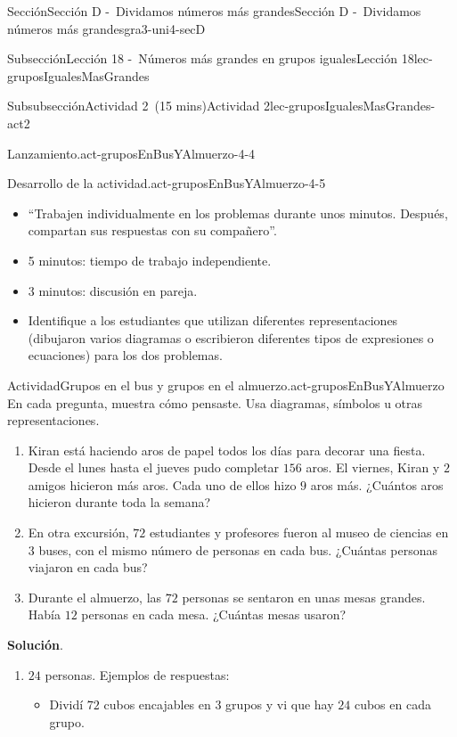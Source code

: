 \documentclass[oneside,10pt,]{article}
\newcommand{\blocktitlefont}{\relax}
\begin{document}
\begin{sectionptx}{Sección}{Sección D -~Dividamos números más grandes}{}{Sección D -~Dividamos números más grandes}{}{}{gra3-uni4-secD}
\begin{subsectionptx}{Subsección}{Lección 18 -~Números más grandes en grupos iguales}{}{Lección 18}{}{}{lec-gruposIgualesMasGrandes}
\begin{subsubsectionptx}{Subsubsección}{Actividad 2~(15 mins)}{}{Actividad 2}{}{}{lec-gruposIgualesMasGrandes-act2}
\begin{paragraphs}{Lanzamiento.}{act-gruposEnBusYAlmuerzo-4-4}
\begin{itemize}[label=\textbullet]
\end{itemize}
\end{paragraphs}%
\begin{paragraphs}{Desarrollo de la actividad.}{act-gruposEnBusYAlmuerzo-4-5}%
%
\begin{itemize}[label=\textbullet]
\item{}``Trabajen individualmente en los problemas durante unos minutos. Después, compartan sus respuestas con su compañero''.%
\item{}5 minutos: tiempo de trabajo independiente.%
\item{}3 minutos: discusión en pareja.%
\item{}Identifique a los estudiantes que utilizan diferentes representaciones (dibujaron varios diagramas o escribieron diferentes tipos de expresiones o ecuaciones) para los dos problemas.%
\end{itemize}
\end{paragraphs}%
\begin{activity}{Actividad}{Grupos en el bus y grupos en el almuerzo.}{act-gruposEnBusYAlmuerzo}%
En cada pregunta, muestra cómo pensaste. Usa diagramas, símbolos u otras representaciones.%
%
\begin{enumerate}
\item{}Kiran está haciendo aros de papel todos los días para decorar una fiesta. Desde el lunes hasta el jueves pudo completar \(156\) aros. El viernes, Kiran y \(2\) amigos hicieron más aros. Cada uno de ellos hizo \(9\) aros más. ¿Cuántos aros hicieron durante toda la semana?%
\item{}En otra excursión, \(72\) estudiantes y profesores fueron al museo de ciencias en \(3\) buses, con el mismo número de personas en cada bus. ¿Cuántas personas viajaron en cada bus?%
\item{}Durante el almuerzo, las \(72\) personas se sentaron en unas mesas grandes. Había \(12\) personas en cada mesa. ¿Cuántas mesas usaron?%
\end{enumerate}
\par\smallskip%
\noindent\textbf{\blocktitlefont Solución}.\hypertarget{act-gruposEnBusYAlmuerzo-3}{}\quad{}%
\begin{enumerate}
\item{}\(24\) personas. Ejemplos de respuestas:%
%
\begin{itemize}[label=\textbullet]
\item{}Dividí \(72\) cubos encajables en \(3\) grupos y vi que hay \(24\) cubos en cada grupo.%

\end{itemize}
\end{enumerate}
\end{activity}
\end{subsubsectionptx}
\end{subsectionptx}
\end{sectionptx}
\end{document}
